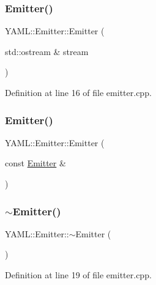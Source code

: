 \subsubsection{\texorpdfstring{Emitter()}{Emitter()}\hspace{0.1cm}{\footnotesize\ttfamily [2/3]}}
{\footnotesize\ttfamily Y\+A\+M\+L\+::\+Emitter\+::\+Emitter (\begin{DoxyParamCaption}\item[{std\+::ostream \&}]{stream }\end{DoxyParamCaption})\hspace{0.3cm}{\ttfamily [explicit]}}



Definition at line 16 of file emitter.\+cpp.

\mbox{\label{class_y_a_m_l_1_1_emitter_ade8be1f6aeecf9869e0e0e3130c51ee2}} 
\subsubsection{\texorpdfstring{Emitter()}{Emitter()}\hspace{0.1cm}{\footnotesize\ttfamily [3/3]}}
{\footnotesize\ttfamily Y\+A\+M\+L\+::\+Emitter\+::\+Emitter (\begin{DoxyParamCaption}\item[{const \mbox{\hyperlink{class_y_a_m_l_1_1_emitter}{Emitter}} \&}]{ }\end{DoxyParamCaption})\hspace{0.3cm}{\ttfamily [delete]}}

\mbox{\label{class_y_a_m_l_1_1_emitter_a14eebff3d7a6a4a8706b75b36261ee03}} 
\subsubsection{\texorpdfstring{$\sim$Emitter()}{~Emitter()}}
{\footnotesize\ttfamily Y\+A\+M\+L\+::\+Emitter\+::$\sim$\+Emitter (\begin{DoxyParamCaption}{ }\end{DoxyParamCaption})}



Definition at line 19 of file emitter.\+cpp.



